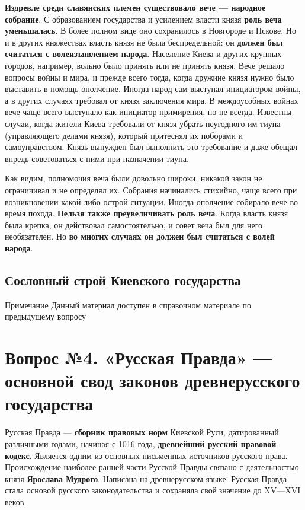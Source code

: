 \documentclass{article}
\begin{document}
\textbf{Издревле среди славянских племен существовало вече — народное собрание}. С образованием государства и усилением власти князя \textbf{роль веча уменьшалась}. В более полном виде оно сохранилось в Новгороде и Пскове. Но и в других княжествах власть князя не была беспредельной: он \textbf{должен был считаться с волеизъявлением народа}. Население Киева и других крупных городов, например, вольно было принять или не принять князя. Вече решало вопросы войны и мира, и прежде всего тогда, когда дружине князя нужно было выставить в помощь ополчение. Иногда народ сам выступал инициатором войны, а в других случаях требовал от князя заключения мира. В междоусобных войнах вече чаще всего выступало как инициатор примирения, но не всегда. Известны случаи, когда жители Киева требовали от князя убрать неугодного им тиуна (управляющего делами князя), который притеснял их поборами и самоуправством. Князь вынужден был выполнить это требование и даже обещал впредь советоваться с ними при назначении тиуна.

\hfill

Как видим, полномочия веча были довольно широки, никакой закон не ограничивал и не определял их. Собрания начинались стихийно, чаще всего при возникновении какой-либо острой ситуации. Иногда ополчение собирало вече во время похода. \textbf{Нельзя также преувеличивать роль веча}. Когда власть князя была крепка, он действовал самостоятельно, и совет веча был для него необязателен. Но \textbf{во многих случаях он должен был считаться с волей народа}.

\subsection{Сословный строй Киевского государства}

\begin{bclogo}[logo=\bcinfo, couleurBarre=orange, noborder=true, couleur=white]{Примечание}
    Данный материал доступен в справочном материале по предыдущему вопросу
\end{bclogo}

\pagebreak
\section{Вопрос №4. «Русская Правда» — основной свод законов древнерусского государства}

Русская Правда — \textbf{сборник правовых норм} Киевской Руси, датированный различными годами, начиная с 1016 года, \textbf{древнейший русский правовой кодекс}. Является одним из основных письменных источников русского права. Происхождение наиболее ранней части Русской Правды связано с деятельностью князя \textbf{Ярослава Мудрого}. Написана на древнерусском языке. Русская Правда стала основой русского законодательства и сохраняла своё значение до XV—XVI веков.
\end{document}
